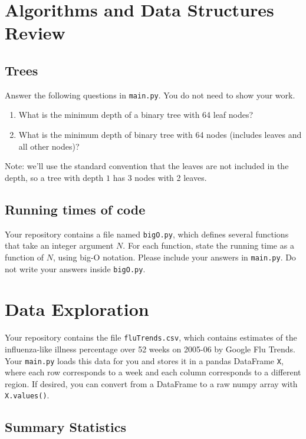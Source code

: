 \documentclass{article}
\def\blu#1{{\color{blu}#1}}
\begin{document}
\section{Algorithms and Data Structures Review}

\subsection{Trees}

\blu{Answer the following questions in \texttt{main.py}.} You do not need to show your work.

\begin{enumerate}
\item What is the minimum depth of a binary tree with 64 leaf nodes?
\item What is the minimum depth of binary tree with 64 nodes (includes leaves and all other nodes)?
\end{enumerate}
Note: we'll use the standard convention that the leaves are not included in the depth, so a tree with depth $1$ has 3 nodes with 2 leaves.

\subsection{Running times of code}

Your repository contains a file named \texttt{bigO.py}, which defines several functions
that take an integer argument $N$. For each function, \blu{state the running time as a function of $N$, using big-O notation}.
Please include your answers in \texttt{main.py}. Do not write your answers inside \texttt{bigO.py}.

\section{Data Exploration}


Your repository contains the file \texttt{fluTrends.csv}, which contains estimates
of the influenza-like illness percentage over 52 weeks on 2005-06 by Google Flu Trends.
Your \texttt{main.py} loads this data for you and stores it in a pandas DataFrame \texttt{X},
where each row corresponds to a week and each column
corresponds to a different
region. If desired, you can convert from a DataFrame to a raw numpy array with \texttt{X.values()}.

\subsection{Summary Statistics}
\end{document}
